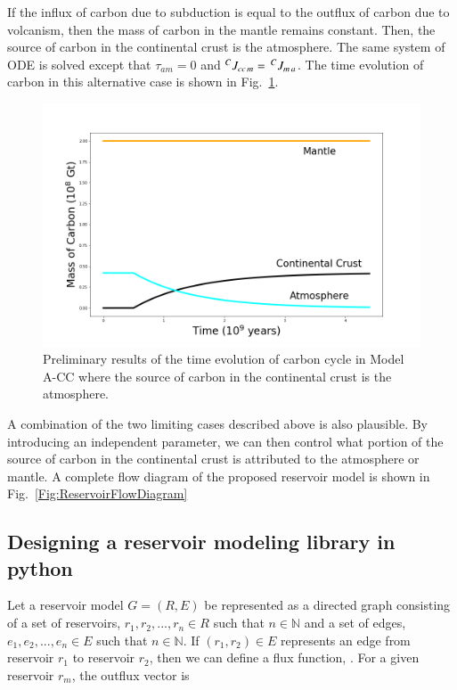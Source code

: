 If the influx of carbon due to subduction is equal to the outflux of carbon due to volcanism, then the mass of carbon in the mantle remains constant. Then, the source of carbon in the continental crust is the atmosphere. The same system of ODE is solved except that $\tau_{am} = 0$ and $\mbox{${^CJ_{cc\,m}}$} =\, \mbox{${^CJ_{m\,a}}$}$. The time evolution of carbon in this alternative case is shown in Fig.~\ref{Fig:ModelA-CC}.

\begin{figure}[h!]
  \centering
  \includegraphics[scale=0.4]{Figures/ModelA-CC.png}
  \caption{Preliminary results of the time evolution of carbon cycle in Model A-CC where the source of carbon in the continental crust is the atmosphere.}
  \label{Fig:ModelA-CC}
\end{figure}

A combination of the two limiting cases described above is also plausible. By introducing an independent parameter, we can then control what portion of the source of carbon in the continental crust is attributed to the atmosphere or mantle. A complete flow diagram of the proposed reservoir model is shown in Fig.~\ref{Fig:ReservoirFlowDiagram}

\subsection{Designing a reservoir modeling library in python}

Let a reservoir model $G = (R, E)$ be represented as a directed graph consisting of a set of reservoirs, $r_1, r_2, ..., r_{n} \in R$ such that $n \in \mathbb{N}$ and a set of edges, $e_1, e_2, ..., e_n \in E$ such that $n \in \mathbb{N}$. If $(r_1,r_2) \in E$ represents an edge from reservoir $r_1$ to reservoir $r_2$, then we can define a flux function, . For a given reservoir $r_m$, the outflux vector is

